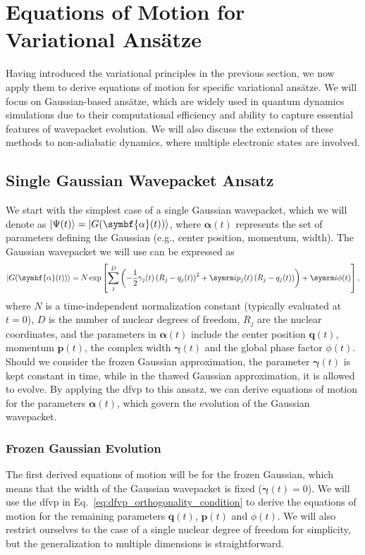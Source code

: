 \section{Equations of Motion for Variational Ans\"atze}\label{sec:variational_principles_eom}
Having introduced the variational principles in the previous section, we now apply them to derive equations of motion for specific variational ans\"atze. We will focus on Gaussian-based ans\"atze, which are widely used in quantum dynamics simulations due to their computational efficiency and ability to capture essential features of wavepacket evolution. We will also discuss the extension of these methods to non-adiabatic dynamics, where multiple electronic states are involved.
\subsection{Single Gaussian Wavepacket Ansatz}
We start with the simplest case of a single Gaussian wavepacket, which we will denote as $\ket{\Psi(t)}=\ket{G(\symbf{\alpha}(t))}$, where $\symbf{\alpha}(t)$ represents the set of parameters defining the Gaussian (e.g., center position, momentum, width). The Gaussian wavepacket we will use can be expressed as
\begin{equation}
\ket{G(\symbf{\alpha}(t))}=N\exp\left[\sum_j^D\left(-\frac{1}{2}\gamma_j(t)\left(R_j-q_j(t)\right)^2+\i p_j(t)\left(R_j-q_j(t)\right)\right)+\i\phi(t)\right],
\end{equation}
where $N$ is a time-independent normalization constant (typically evaluated at $t=0$), $D$ is the number of nuclear degrees of freedom, $R_j$ are the nuclear coordinates, and the parameters in $\symbf{\alpha}(t)$ include the center position $\symbf{q}(t)$, momentum $\symbf{p}(t)$, the complex width $\symbf{\gamma}(t)$ and the global phase factor $\phi(t)$. Should we consider the frozen Gaussian approximation, the parameter $\symbf{\gamma}(t)$ is kept constant in time, while in the thawed Gaussian approximation, it is allowed to evolve. By applying the \gls{dfvp} to this ansatz, we can derive equations of motion for the parameters $\symbf{\alpha}(t)$, which govern the evolution of the Gaussian wavepacket.
\subsubsection{Frozen Gaussian Evolution}
The first derived equations of motion will be for the frozen Gaussian, which means that the width of the Gaussian wavepacket is fixed ($\dot{\symbf{\gamma}}(t)=0$). We will use the \gls{dfvp} in Eq.~\eqref{eq:dfvp_orthogonality_condition} to derive the equations of motion for the remaining parameters $\symbf{q}(t)$, $\symbf{p}(t)$ and $\phi(t)$. We will also restrict ourselves to the case of a single nuclear degree of freedom for simplicity, but the generalization to multiple dimensions is straightforward.

